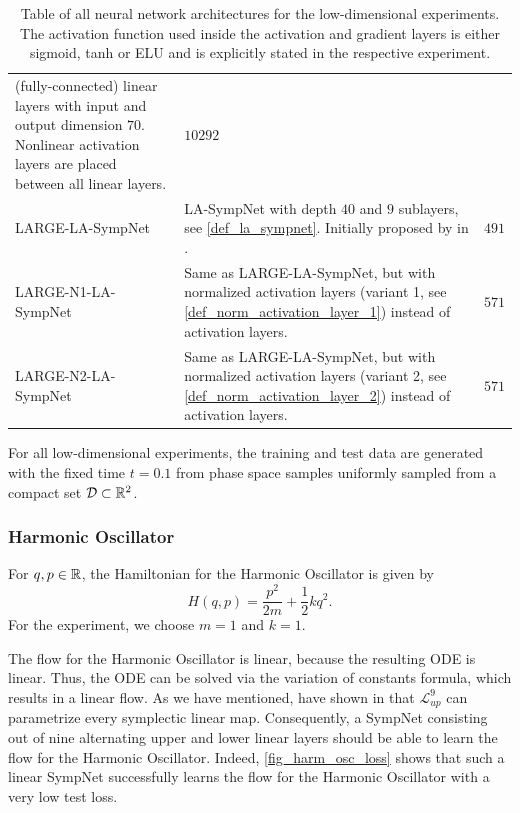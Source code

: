 \documentclass[twoside,a4paper]{article}
\begin{document}
\begin{table}
\begin{tabular}{lp{8cm}c}
		(fully-connected) linear layers with input and output dimension $70$.
		Nonlinear activation layers are placed between all linear layers.
		& $10292$ \\
		LARGE-LA-SympNet & LA-SympNet with depth $40$ and $9$ sublayers, see \cref{def_la_sympnet}.
		Initially proposed by \citeauthor{Jin2020} in \cite{Jin2020}.
		& $491$ \\
		LARGE-N1-LA-SympNet & 
		Same as LARGE-LA-SympNet, but with normalized activation layers (variant 1, 
		see \cref{def_norm_activation_layer_1}) instead of activation layers.
		& $571$ \\
		LARGE-N2-LA-SympNet & 
		Same as LARGE-LA-SympNet, but with normalized activation layers (variant 2, 
		see \cref{def_norm_activation_layer_2}) instead of activation layers.
		& $571$ \\ \bottomrule
	\end{tabular}
	\caption{
	Table of all neural network architectures for the
	low-dimensional experiments. The activation function used inside the activation
	and gradient layers is either sigmoid, tanh or ELU and is explicitly stated
	in the respective experiment.
	}\label{table_low_dim_arch}
\end{table}

For all low-dimensional experiments, the training and test data are generated
with the fixed time $t = 0.1$
from phase space samples uniformly sampled from a compact set $\mathcal{D} \subset \mathbb{R}^2$.

\subsubsection{Harmonic Oscillator}

For $q,p \in \mathbb{R}$, the Hamiltonian for the Harmonic Oscillator is given by
\begin{equation*}
	H(q,p) = \frac{p^2}{2m} + \frac{1}{2} kq^2
	.
\end{equation*}
For the experiment, we choose $m=1$ and $k=1$.

The flow for the Harmonic Oscillator is linear, because the resulting ODE
is linear. Thus, the ODE can be solved via the variation of constants formula,
which results in a linear flow.
As we have mentioned,
\citeauthor{jin2020unit} have shown in \cite{jin2020unit} that $\mathcal{L}^{9}_{up}$
can parametrize every symplectic linear map.
Consequently, a SympNet consisting out of nine alternating 
upper and lower linear layers should be able to learn the flow for the Harmonic Oscillator.
Indeed, \cref{fig_harm_osc_loss} shows that such a linear SympNet successfully 
learns the flow for the Harmonic Oscillator with a very low test loss.
\end{document}
